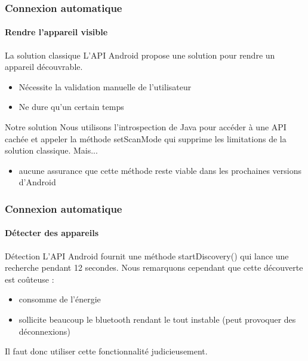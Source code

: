 \documentclass{beamer}
\begin{document}
    \begin{frame}
      \frametitle{Connexion automatique}
      \framesubtitle{Rendre l'appareil visible}
      \begin{block}{La solution classique}
        L'API Android propose une solution pour rendre un appareil découvrable.
        \begin{itemize}
          \item Nécessite la validation manuelle de l'utilisateur
          \item Ne dure qu'un certain temps
        \end{itemize}
      \end{block}
      \begin{block}{Notre solution}
        Nous utilisons l'introspection de Java pour accéder à une API cachée et appeler la méthode setScanMode qui supprime les limitations de la solution classique. Mais...
        \begin{itemize}
          \item aucune assurance que cette méthode reste viable dans les prochaines versions d'Android
        \end{itemize}
      \end{block}
    \end{frame}
    \begin{frame}
      \frametitle{Connexion automatique}
      \framesubtitle{Détecter des appareils}
      \begin{block}{Détection}
        L'API Android fournit une méthode startDiscovery() qui lance une recherche pendant 12 secondes. Nous remarquons cependant que cette découverte est coûteuse :
        \begin{itemize}
          \item consomme de l'énergie
          \item sollicite beaucoup le bluetooth rendant le tout instable (peut provoquer des déconnexions)
        \end{itemize}
        Il faut donc utiliser cette fonctionnalité judicieusement.
      \end{block}
    \end{frame}
\end{document}
